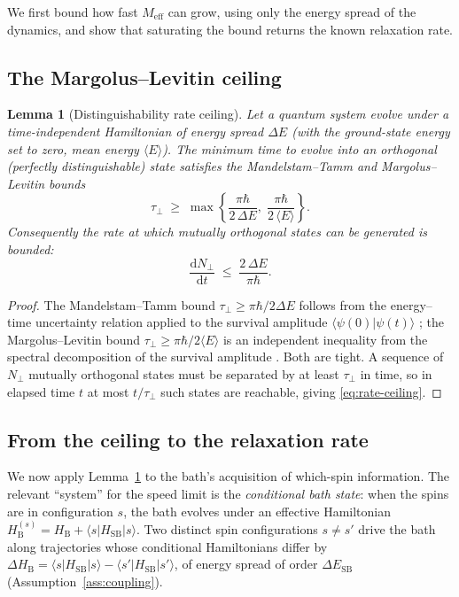 \documentclass[twocolumn,10pt,a4paper]{article}
\theoremstyle{thmstyle}
\newtheorem{lemma}[theorem]{Lemma}
\theoremstyle{definition}
\theoremstyle{remark}
\newcommand{\Meff}{M_{\mathrm{eff}}}
\newcommand{\dd}{\mathrm{d}}
\begin{document}
We first bound how fast $\Meff$ can grow, using only the energy spread of
the dynamics, and show that saturating the bound returns the known
relaxation rate.

\subsection{The Margolus--Levitin ceiling}

\begin{lemma}[Distinguishability rate ceiling]
\label{lem:ML}
Let a quantum system evolve under a time-independent Hamiltonian of energy
spread $\Delta E$ (with the ground-state energy set to zero, mean energy
$\langle E\rangle$). The minimum time to evolve into an orthogonal
(perfectly distinguishable) state satisfies the Mandelstam--Tamm and
Margolus--Levitin bounds
\begin{equation}
\tau_{\perp}\;\geq\;\max\!\left\{\frac{\pi\hbar}{2\,\Delta E},\;
\frac{\pi\hbar}{2\,\langle E\rangle}\right\}.
\label{eq:ML}
\end{equation}
Consequently the rate at which mutually orthogonal states can be
generated is bounded:
\begin{equation}
\frac{\dd N_{\perp}}{\dd t}\;\leq\;\frac{2\,\Delta E}{\pi\hbar}.
\label{eq:rate-ceiling}
\end{equation}
\end{lemma}

\begin{proof}
The Mandelstam--Tamm bound $\tau_{\perp}\geq\pi\hbar/2\Delta E$ follows
from the energy--time uncertainty relation applied to the survival
amplitude $\langle\psi(0)|\psi(t)\rangle$
\citep{mandelstam1945,deffner2017}; the Margolus--Levitin bound
$\tau_{\perp}\geq\pi\hbar/2\langle E\rangle$ is an independent inequality
from the spectral decomposition of the survival amplitude
\citep{margolus1998}. Both are tight. A sequence of $N_{\perp}$ mutually
orthogonal states must be separated by at least $\tau_{\perp}$ in time, so
in elapsed time $t$ at most $t/\tau_{\perp}$ such states are reachable,
giving \eqref{eq:rate-ceiling}.
\end{proof}

\subsection{From the ceiling to the relaxation rate}

We now apply Lemma~\ref{lem:ML} to the bath's acquisition of which-spin
information. The relevant ``system'' for the speed limit is the
\emph{conditional bath state}: when the spins are in configuration $s$,
the bath evolves under an effective Hamiltonian
$H_{\mathrm{B}}^{(s)}=H_{\mathrm{B}}+\langle s|H_{\mathrm{SB}}|s\rangle$.
Two distinct spin configurations $s\neq s'$ drive the bath along
trajectories whose conditional Hamiltonians differ by
$\Delta H_{\mathrm{B}}=\langle s|H_{\mathrm{SB}}|s\rangle
-\langle s'|H_{\mathrm{SB}}|s'\rangle$, of energy spread of order
$\Delta E_{\mathrm{SB}}$ (Assumption~\ref{ass:coupling}).
\end{document}
